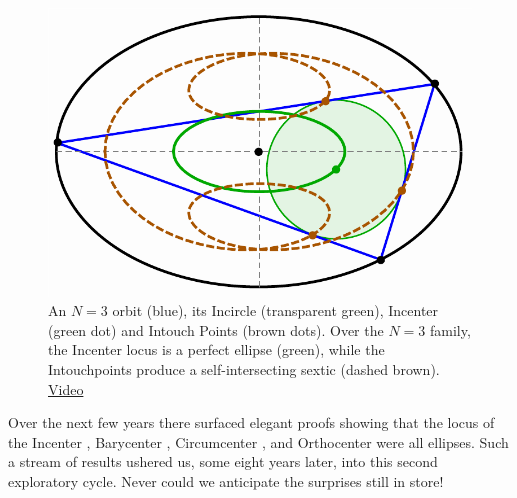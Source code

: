 \begin{figure}
    \centering
    \includegraphics[width=.7\textwidth]{pics/u1001_intro_plot.pdf}
    \caption{An $N=3$ orbit (blue), its Incircle (transparent green), Incenter (green dot) and Intouch Points (brown dots). Over the $N=3$ family, the Incenter locus is a perfect ellipse (green), while the Intouchpoints produce a self-intersecting sextic (dashed brown).
    \href{https://youtu.be/9xU6T7hQMzs}{Video} \cite[pl\#2]{dsr_math_intell_playlist}}
    \label{fig:intro-plot}
\end{figure}
%
 Over the next few years there surfaced elegant proofs showing that the locus of the Incenter \cite{ronaldo16,olga14}, Barycenter \cite{ronaldo19,sergei2016}, Circumcenter  \cite{corentin19,ronaldo19}, and Orthocenter \cite{ronaldo19} were all ellipses. Such a stream of results ushered us, some eight years later, into this second exploratory cycle. Never could we anticipate the surprises still in store!


